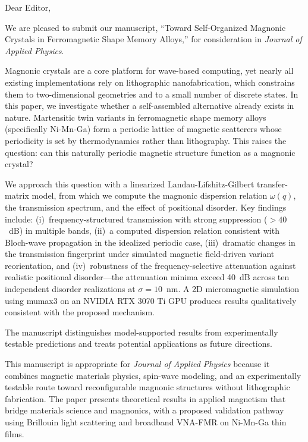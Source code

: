 \documentclass[12pt]{article}
\begin{document}
\thispagestyle{empty}

\bigskip

Dear Editor,

\bigskip

We are pleased to submit our manuscript, ``Toward Self-Organized Magnonic Crystals in Ferromagnetic Shape Memory Alloys,'' for consideration in \textit{Journal of Applied Physics}.

Magnonic crystals are a core platform for wave-based computing, yet nearly all existing implementations rely on lithographic nanofabrication, which constrains them to two-dimensional geometries and to a small number of discrete states. In this paper, we investigate whether a self-assembled alternative already exists in nature. Martensitic twin variants in ferromagnetic shape memory alloys (specifically Ni-Mn-Ga) form a periodic lattice of magnetic scatterers whose periodicity is set by thermodynamics rather than lithography. This raises the question: can this naturally periodic magnetic structure function as a magnonic crystal?

We approach this question with a linearized Landau-Lifshitz-Gilbert transfer-matrix model, from which we compute the magnonic dispersion relation $\omega(q)$, the transmission spectrum, and the effect of positional disorder. Key findings include: (i)~frequency-structured transmission with strong suppression ($>40$~dB) in multiple bands, (ii)~a computed dispersion relation consistent with Bloch-wave propagation in the idealized periodic case, (iii)~dramatic changes in the transmission fingerprint under simulated magnetic field-driven variant reorientation, and (iv)~robustness of the frequency-selective attenuation against realistic positional disorder---the attenuation minima exceed 40~dB across ten independent disorder realizations at $\sigma = 10$~nm. A 2D micromagnetic simulation using mumax3 on an NVIDIA RTX 3070 Ti GPU produces results qualitatively consistent with the proposed mechanism.

The manuscript distinguishes model-supported results from experimentally testable predictions and treats potential applications as future directions.

This manuscript is appropriate for \textit{Journal of Applied Physics} because it combines magnetic materials physics, spin-wave modeling, and an experimentally testable route toward reconfigurable magnonic structures without lithographic fabrication. The paper presents theoretical results in applied magnetism that bridge materials science and magnonics, with a proposed validation pathway using Brillouin light scattering and broadband VNA-FMR on Ni-Mn-Ga thin films.
\end{document}
